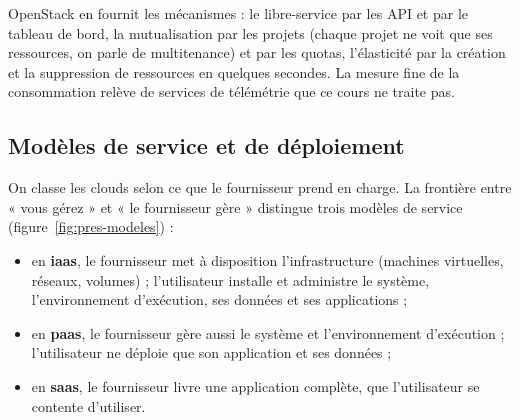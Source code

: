 OpenStack en fournit les mécanismes : le libre-service par les API et par le tableau de bord, la mutualisation par les projets
(chaque projet ne voit que ses ressources, on parle de \gls{multitenance}) et par les \glspl{quota}, l'élasticité par la création
et la suppression de ressources en quelques secondes. La mesure fine de la consommation relève de services de télémétrie que ce
cours ne traite pas.

\subsection{Modèles de service et de déploiement}\label{sec:pres-modeles}

On classe les clouds selon ce que le fournisseur prend en charge. La frontière entre « vous gérez » et « le fournisseur gère »
distingue trois modèles de service (figure~\ref{fig:pres-modeles}) :

\begin{itemize}
  \item en \textbf{\gls{iaas}}, le fournisseur met à disposition l'infrastructure (machines virtuelles, réseaux, volumes) ; l'utilisateur
        installe et administre le système, l'environnement d'exécution, ses données et ses applications ;
  \item en \textbf{\gls{paas}}, le fournisseur gère aussi le système et l'environnement d'exécution ; l'utilisateur ne déploie que son
        application et ses données ;
  \item en \textbf{\gls{saas}}, le fournisseur livre une application complète, que l'utilisateur se contente d'utiliser.
\end{itemize}


